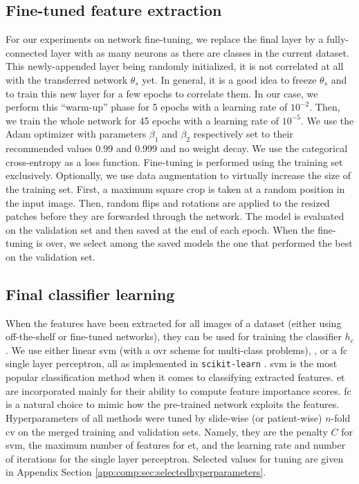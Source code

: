 \subsection{Fine-tuned feature extraction}
\label{ssec:comp:meth_fine_tuning}

For our experiments on network fine-tuning, we replace the final  layer by a fully-connected layer with as many neurons as there are classes in the current dataset. This newly-appended layer being randomly initialized, it is not correlated at all with the transferred network $\theta_s$ yet. In general, it is a good idea to freeze $\theta_s$ and to train this new layer for a few epochs to correlate them. In our case, we perform this ``warm-up'' phase for 5 epochs with a learning rate of $10^{-2}$. Then, we train the whole network for 45 epochs with a learning rate of $10^{-5}$. We use the Adam optimizer \cite{kingma2014adam} with parameters $\beta_1$ and $\beta_2$ respectively set to their recommended values 0.99 and 0.999 and no weight decay. We use the categorical cross-entropy as a loss function. Fine-tuning is performed using the training set exclusively. Optionally, we use data augmentation to virtually increase the size of the training set. First, a maximum square crop is taken at a random position in the input image. %
Then, random flips and rotations are applied to the resized patches before they are forwarded through the network. The model is evaluated on the validation set and then saved at the end of each epoch. When the fine-tuning is over, we select among the saved models the one that performed the best on the validation set.

\subsection{Final classifier learning}
\label{ssec:comp:final_classifier}
When the features have been extracted for all images of a dataset (either using off-the-shelf or fine-tuned networks), they can be used for training the classifier $h_c$. 
We use either linear \acrshort{svm} \cite{boser1992training} (with a \acrlong{ovr} scheme for multi-class problems),  \cite{geurts2006extremely}, or a \acrlong{fc} single layer perceptron, all as implemented in \texttt{scikit-learn} \cite{scikit-learn}. \acrshort{svm} is the most popular classification method when it comes to classifying extracted features. \acrshort{et} are incorporated mainly for their ability to compute feature importance scores. \acrshort{fc} is a natural choice to mimic how the pre-trained network exploits the features. Hyperparameters of all methods were tuned by slide-wise (or patient-wise) $n$-fold \acrlong{cv} on the merged training and validation sets. Namely, they are the penalty $C$ for \acrshort{svm}, the maximum number of features for \acrshort{et}, and the learning rate and number of iterations for the single layer perceptron. Selected values for tuning are given in Appendix Section \ref{app:comp:sec:selectedhyperparameters}.

